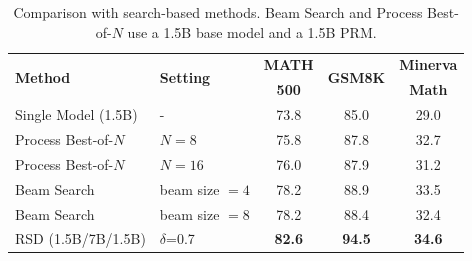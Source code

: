 \documentclass{article}
\theoremstyle{plain}
\theoremstyle{definition}
\theoremstyle{remark}
\begin{document}
\begin{table}[t]
\caption{Comparison with search-based methods. Beam Search and Process Best-of-$N$ use a 1.5B base model and a 1.5B PRM.}
\label{tab:beam}
\vskip 0.1in
\scriptsize
\begin{center}
\begin{tabular}{llccc}
\toprule
\multirow{2}{*}{\textbf{Method}}  & \multirow{2}{*}{\textbf{Setting}} & \textbf{MATH} & \multirow{2}{*}{\textbf{GSM8K}} & \textbf{Minerva} \\
& & \textbf{500} & & \textbf{Math} \\ 
\midrule
Single Model (1.5B) &  - & 73.8 & 85.0 & 29.0 \\
Process Best-of-$N$ &  $N=8$ & 75.8 & 87.8 & 32.7 \\
Process Best-of-$N$ &  $N=16$ & 76.0 & 87.9 & 31.2 \\
Beam Search &  beam size $=4$ & 78.2 & 88.9 & 33.5 \\
Beam Search &  beam size $=8$ & 78.2 & 88.4 & 32.4 \\
\rowcolor{blue!8}
RSD (1.5B/7B/1.5B) &   $\delta$=0.7 & \textbf{82.6} & \textbf{94.5} & \textbf{34.6} \\ 
\bottomrule
\end{tabular}
\end{center}
\vskip -0.1in
\vspace{-1em}
\end{table}
\end{document}
